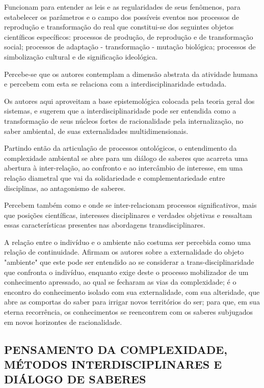 \documentclass[
   article,       %
   12pt,          %
   oneside,       %
   a4paper,       %
   english,       %
   brazil,           %
   sumario=tradicional
   ]{abntex2}
\begin{document}
Funcionam para entender as leis e as regularidades de seus fenômenos, para estabelecer os parâmetros e o campo dos possíveis eventos nos processos de reprodução e transformação do real que constitui-se dos seguintes objetos científicos específicos: processos de produção, de reprodução e de transformação social; processos de adaptação - transformação - mutação biológica; processos de simbolização cultural e de significação ideológica. 

Percebe-se que os autores contemplam a dimensão abstrata da atividade humana e percebem com esta se relaciona com a interdisciplinaridade estudada.

Os autores aqui aproveitam a base epistemológica colocada pela teoria geral dos sistemas, e sugerem que a interdisciplinaridade pode ser entendida como a transformação de seus núcleos fortes de racionalidade pela internalização, no saber ambiental, de suas externalidades multidimensionais.

Partindo então da articulação de processos ontológicos, o entendimento da complexidade ambiental se abre para um diálogo de saberes que acarreta uma abertura à inter-relação, ao confronto e ao intercâmbio de interesse, em uma relação diametral que vai da solidariedade e complementariedade entre disciplinas, ao antagonismo de saberes. 

Percebem também como e onde se inter-relacionam processos significativos, mais que posições científicas, interesses disciplinares e verdades objetivas e ressaltam essas características presentes nas abordagens transdisciplinares.

A relação entre o indivíduo e o ambiente não costuma ser percebida como uma relação de continuidade. Afirmam os autores sobre a externalidade do objeto "ambiente" que este pode ser entendido ao se considerar a trans-disciplinaridade que confronta o indivíduo, enquanto exige deste o processo mobilizador de um conhecimento apressado, ao qual se fecharam as vias da complexidade; é o encontro do conhecimento isolado com sua externalidade, com sua alteridade, que abre as comportas do saber para irrigar novos territórios do ser; para que, em sua eterna recorrência, os conhecimentos se reencontrem com os saberes subjugados em novos horizontes de racionalidade.

\subsection{PENSAMENTO DA COMPLEXIDADE, MÉTODOS
INTERDISCIPLINARES E DIÁLOGO DE SABERES}
\end{document}
